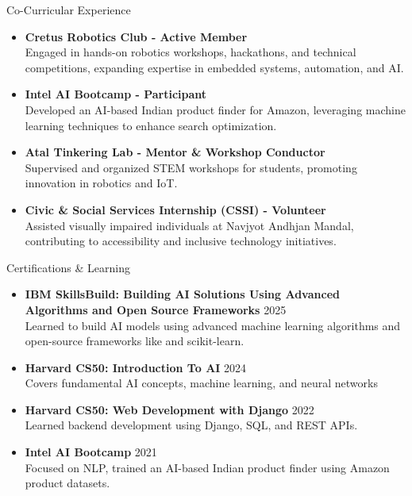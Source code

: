 \documentclass{resume} %
\begin{document}
\begin{rSection}{Co-Curricular Experience}
\begin{itemize}
    \item \textbf{Cretus Robotics Club - Active Member} \\ Engaged in hands-on robotics workshops, hackathons, and technical competitions, expanding expertise in embedded systems, automation, and AI.  
    \item \textbf{Intel AI Bootcamp - Participant} \\ Developed an AI-based Indian product finder for Amazon, leveraging machine learning techniques to enhance search optimization.  
    \item \textbf{Atal Tinkering Lab - Mentor \& Workshop Conductor} \\ Supervised and organized STEM workshops for students, promoting innovation in robotics and IoT.  
    \item \textbf{Civic \& Social Services Internship (CSSI) - Volunteer} \\ Assisted visually impaired individuals at Navjyot Andhjan Mandal, contributing to accessibility and inclusive technology initiatives.  
\end{itemize}
\end{rSection}

\begin{rSection}{Certifications \& Learning} 
\begin{itemize}
    \item \textbf{IBM SkillsBuild: Building AI Solutions Using Advanced Algorithms and Open Source Frameworks }\hfill 2025 \\ Learned to build AI models using advanced machine learning algorithms and open-source frameworks like and scikit-learn.
    \item \textbf{Harvard CS50: Introduction To AI} \hfill2024 \\Covers fundamental AI concepts, machine learning, and neural networks 
    \item \textbf{Harvard CS50: Web Development with Django} \hfill 2022 \\Learned backend development using Django, SQL, and REST APIs.
    \item \textbf{Intel AI Bootcamp }\hfill 2021\\Focused on NLP, trained an AI-based Indian product finder using Amazon product datasets.
\end{itemize}


\end{rSection}
\end{document}
